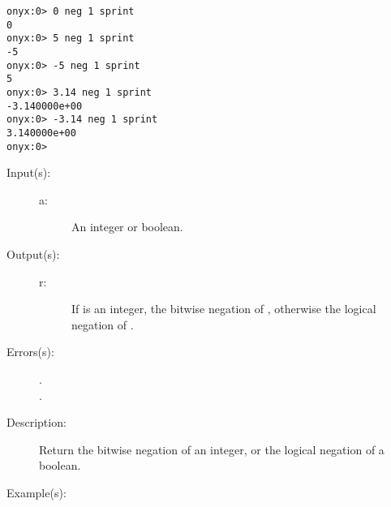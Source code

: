 \begin{description}
\begin{description}
\begin{verbatim}
onyx:0> 0 neg 1 sprint
0
onyx:0> 5 neg 1 sprint
-5
onyx:0> -5 neg 1 sprint
5
onyx:0> 3.14 neg 1 sprint
-3.140000e+00
onyx:0> -3.14 neg 1 sprint
3.140000e+00
onyx:0>
		\end{verbatim}
	\end{description}
\label{systemdict:not}
\item[{\onyxop{a}{not}{r}}: ]
	\begin{description}\item[]
	\item[Input(s): ]
		\begin{description}\item[]
		\item[a: ]
			An integer or boolean.
		\end{description}
	\item[Output(s): ]
		\begin{description}\item[]
		\item[r: ]
			If  is an integer, the bitwise negation of
			, otherwise the logical negation of .
		\end{description}
	\item[Errors(s): ]
		\begin{description}\item[]
		\item[.]
		\item[.]
		\end{description}
	\item[Description: ]
		Return the bitwise negation of an integer, or the logical
		negation of a boolean.
	\item[Example(s): ]\begin{verbatim}


\end{verbatim}
\end{description}
\end{description}
